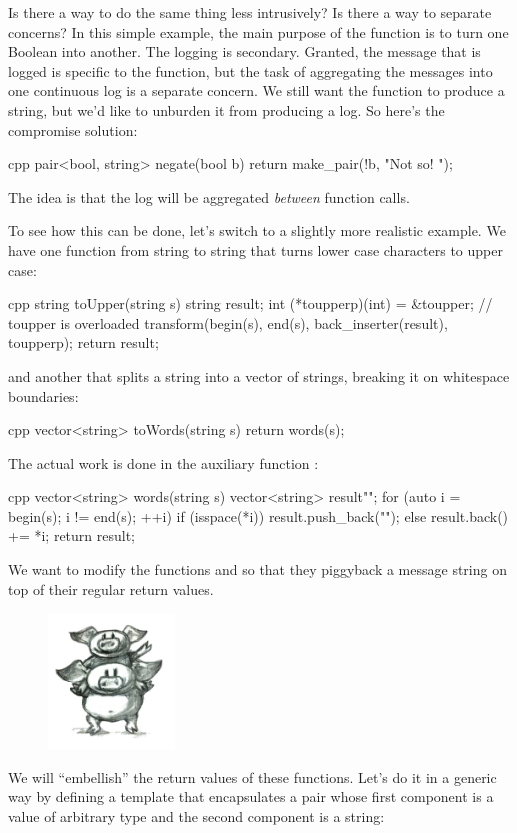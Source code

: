Is there a way to do the same thing less intrusively? Is there a way to
separate concerns? In this simple example, the main purpose of the
function  is to turn one Boolean into another. The
logging is secondary. Granted, the message that is logged is specific to
the function, but the task of aggregating the messages into one
continuous log is a separate concern. We still want the function to
produce a string, but we'd like to unburden it from producing a log. So
here's the compromise solution:

\begin{snip}{cpp}
pair<bool, string> negate(bool b) {
    return make_pair(!b, "Not so! ");
}
\end{snip}
The idea is that the log will be aggregated \emph{between} function
calls.

To see how this can be done, let's switch to a slightly more realistic
example. We have one function from string to string that turns lower
case characters to upper case:

\begin{snip}{cpp}
string toUpper(string s) {
    string result;
    int (*toupperp)(int) = &toupper; // toupper is overloaded
    transform(begin(s), end(s), back_inserter(result), toupperp);
    return result;
}
\end{snip}
and another that splits a string into a vector of strings, breaking it
on whitespace boundaries:

\begin{snip}{cpp}
vector<string> toWords(string s) {
    return words(s);
}
\end{snip}
The actual work is done in the auxiliary function :

\begin{snip}{cpp}
vector<string> words(string s) {
    vector<string> result{""};
    for (auto i = begin(s); i != end(s); ++i)
    {
        if (isspace(*i))
            result.push_back("");
        else
            result.back() += *i;
    }
    return result;
}
\end{snip}
We want to modify the functions  and  so
that they piggyback a message string on top of their regular return
values.

\begin{figure}[H]
  \centering
  \includegraphics[width=0.3\textwidth]{images/piggyback.jpg}
\end{figure}
\noindent
We will ``embellish'' the return values of these functions. Let's do it
in a generic way by defining a template  that
encapsulates a pair whose first component is a value of arbitrary type
 and the second component is a string:

